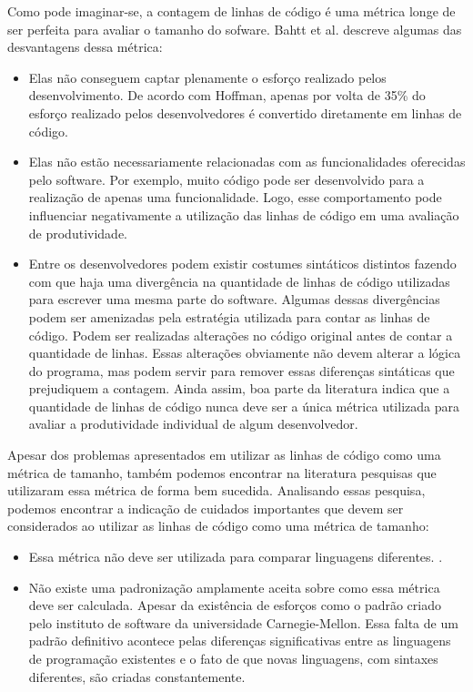 Como pode imaginar-se, a contagem de linhas de código é uma métrica longe de ser perfeita para avaliar o tamanho do sofware. Bahtt et al. \cite{bhatt2012analysis} descreve algumas das desvantagens dessa métrica:

\begin{itemize}
\item Elas não conseguem captar plenamente o esforço realizado pelos desenvolvimento. De acordo com Hoffman\cite{hoffman2000darker}, apenas por volta de 35\% do esforço realizado pelos desenvolvedores é convertido diretamente em linhas de código.
\item Elas não estão necessariamente relacionadas com as funcionalidades oferecidas pelo software. Por exemplo, muito código pode ser desenvolvido para a realização de apenas uma funcionalidade. Logo, esse comportamento pode influenciar negativamente a utilização das linhas de código em uma avaliação de produtividade.
\item Entre os desenvolvedores podem existir costumes sintáticos distintos fazendo com que haja uma divergência na quantidade de linhas de código utilizadas para escrever uma mesma parte do software. Algumas dessas divergências podem ser amenizadas pela estratégia utilizada para contar as linhas de código. Podem ser realizadas alterações no código original antes de contar a quantidade de linhas. Essas alterações obviamente não devem alterar a lógica do programa, mas podem servir para remover essas diferenças sintáticas que prejudiquem a contagem. Ainda assim, boa parte da literatura indica que a quantidade de linhas de código nunca deve ser  a única métrica utilizada para avaliar a produtividade individual de algum desenvolvedor.
\end{itemize}

Apesar dos problemas apresentados em utilizar as linhas de código como uma métrica de tamanho, também podemos encontrar na literatura pesquisas que utilizaram essa métrica de forma bem sucedida\cite{maccormack2003trade,funk2005application,sudhakar2012measuring,tan2009productivity}. Analisando essas pesquisa, podemos encontrar a indicação de cuidados importantes que devem ser considerados ao utilizar as linhas de código como uma métrica de tamanho:

\begin{itemize}
\item Essa métrica não deve ser utilizada para comparar linguagens diferentes. \cite{rosenberg1997some,park1992software}.
\item Não existe uma padronização amplamente aceita sobre como essa métrica deve ser calculada. Apesar da existência de esforços como o padrão criado pelo instituto de software da universidade Carnegie-Mellon\cite{park1992software}. Essa falta de um padrão definitivo acontece pelas diferenças significativas entre as linguagens de programação existentes e o fato de que novas linguagens, com sintaxes diferentes, são criadas constantemente.
\end{itemize} 


